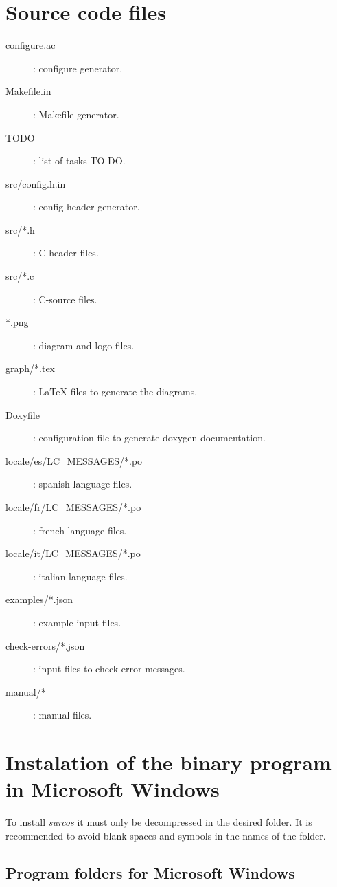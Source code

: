 \section{Source code files}

\begin{description}
\item[configure.ac]: configure generator.
\item[Makefile.in]: Makefile generator.
\item[TODO]: list of tasks TO DO.
\item[src/config.h.in]: config header generator.
\item[src/*.h]: C-header files.
\item[src/*.c]: C-source files.
\item[*.png]: diagram and logo files.
\item[graph/*.tex]: LaTeX files to generate the diagrams.
\item[Doxyfile]: configuration file to generate doxygen documentation.
\item[locale/es/LC\_MESSAGES/*.po]: spanish language files.
\item[locale/fr/LC\_MESSAGES/*.po]: french language files.
\item[locale/it/LC\_MESSAGES/*.po]: italian language files.
\item[examples/*.json]: example input files.
\item[check-errors/*.json]: input files to check error messages.
\item[manual/*]: manual files.
\end{description}

\section{Instalation of the binary program in Microsoft Windows}

To install \emph{surcos} it must only be decompressed in the desired folder.
It is recommended to avoid blank spaces and symbols in the names of the folder. 

\subsection{Program folders for Microsoft Windows}

